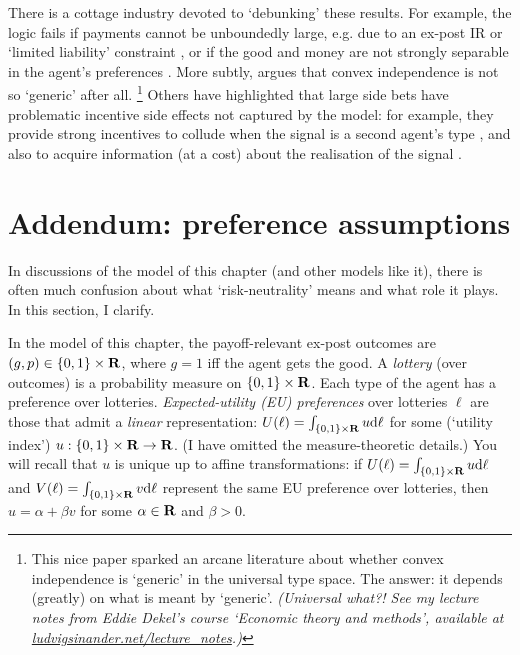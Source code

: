 There is a cottage industry devoted to `debunking' these results.
For example, the logic fails if payments cannot be unboundedly large, e.g. due to an ex-post IR or `limited liability' constraint \parencite{Robert1991},
or if the good and money are not strongly separable in the agent's preferences \parencite{Robert1991,Eso2005}.
More subtly, \textcite{Neeman2004} argues that convex independence is not so `generic' after all.%
	\footnote{This nice paper sparked an arcane literature about whether convex independence is `generic' in the universal type space.
	The answer: it depends (greatly) on what is meant by `generic'.
	\emph{(Universal what?! See my lecture notes from Eddie Dekel's course `Economic theory and methods', available at \href{https://ludvigsinander.net/lecture_notes}{ludvigsinander.net/lecture\_notes}.)}}
Others have highlighted that large side bets have problematic incentive side effects not captured by the model:
for example,
they provide strong incentives to collude when the signal is a second agent's type \parencite{LaffontMartimort2000},
and also to acquire information (at a cost) about the realisation of the signal \parencite{Laohakunakorn2019}.



\section{Addendum: preference assumptions}
\label{sec:ch1:risk-neutrality}

In discussions of the model of this chapter (and other models like it), there is often much confusion about what `risk-neutrality' means and what role it plays. In this section, I clarify.

In the model of this chapter, the payoff-relevant ex-post outcomes are $(g,p) \in \{0,1\} \times \mathbf{R}$, where $g=1$ iff the agent gets the good.
A \emph{lottery} (over outcomes) is a probability measure on $\{0,1\} \times \mathbf{R}$.
Each type of the agent has a preference over lotteries.
\emph{Expected-utility (EU) preferences} over lotteries $\ell$ are those that admit a \emph{linear} representation:
$U(\ell) = \int_{\{0,1\} \times \mathbf{R}} u \mathrm{d} \ell$
for some (`utility index') $u : \{0,1\} \times \mathbf{R} \to \mathbf{R}$.
(I have omitted the measure-theoretic details.)
You will recall that $u$ is unique up to affine transformations:
if $U(\ell) = \int_{\{0,1\} \times \mathbf{R}} u \mathrm{d} \ell$
and $V(\ell) = \int_{\{0,1\} \times \mathbf{R}} v \mathrm{d} \ell$ represent the same EU preference over lotteries, then $u = \alpha + \beta v$ for some $\alpha \in \mathbf{R}$ and $\beta>0$.

